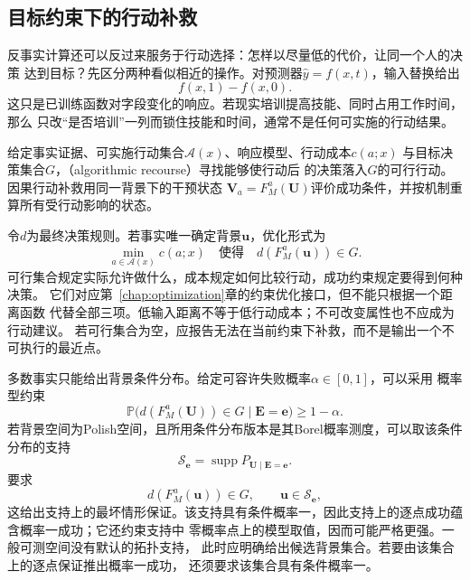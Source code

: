 \subsection{目标约束下的行动补救}
\label{sec:causal-action-recourse}

反事实计算还可以反过来服务于行动选择：怎样以尽量低的代价，让同一个人的决策
达到目标？先区分两种看似相近的操作。对预测器\(\widehat y=f(x,t)\)，输入替换给出
\[
  f(x,1)-f(x,0).
\]
这只是已训练函数对字段变化的响应。若现实培训提高技能、同时占用工作时间，那么
只改“是否培训”一列而锁住技能和时间，通常不是任何可实施的行动结果。

\begin{definition}[因果行动补救]
  \label{def:causal-recourse}
  给定事实证据、可实施行动集合\(\mathcal A(x)\)、响应模型、行动成本\(c(a;x)\)
  与目标决策集合\(G\)，（algorithmic recourse）寻找能够使行动后
  的决策落入\(G\)的可行行动。因果行动补救用同一背景下的干预状态
  \(\bm V_a=F_M^a(\bm U)\)评价成功条件，并按机制重算所有受行动影响的状态。
\end{definition}

令\(d\)为最终决策规则。若事实唯一确定背景\(\bm u\)，优化形式为
\begin{equation}
  \min_{a\in\mathcal A(x)}c(a;x)
  \quad\text{使得}\quad d(F_M^a(\bm u))\in G.
  \label{eq:causal-recourse-objective}
\end{equation}
可行集合规定实际允许做什么，成本规定如何比较行动，成功约束规定要得到何种决策。
它们对应第~\ref{chap:optimization}章的约束优化接口，但不能只根据一个距离函数
代替全部三项。低输入距离不等于低行动成本；不可改变属性也不应成为行动建议。
若可行集合为空，应报告无法在当前约束下补救，而不是输出一个不可执行的最近点。

多数事实只能给出背景条件分布。给定可容许失败概率\(\alpha\in[0,1]\)，可以采用
概率型约束
\begin{equation}
  \mathbb P\bigl(d(F_M^a(\bm U))\in G\mid\bm E=\bm e\bigr)
  \geq1-\alpha.
  \label{eq:causal-recourse-probability}
\end{equation}
若背景空间为Polish空间，且所用条件分布版本是其Borel概率测度，可以取该条件分布的支持
\[
  \mathcal S_{\bm e}
  =\operatorname{supp}P_{\bm U\mid\bm E=\bm e}.
\]
要求
\begin{equation}
  d(F_M^a(\bm u))\in G,\qquad \bm u\in\mathcal S_{\bm e},
  \label{eq:causal-recourse-robust}
\end{equation}
这给出支持上的最坏情形保证。该支持具有条件概率一，因此支持上的逐点成功蕴含概率一成功；它还约束支持中
零概率点上的模型取值，因而可能严格更强。一般可测空间没有默认的拓扑支持，
此时应明确给出候选背景集合。若要由该集合上的逐点保证推出概率一成功，
还须要求该集合具有条件概率一。

